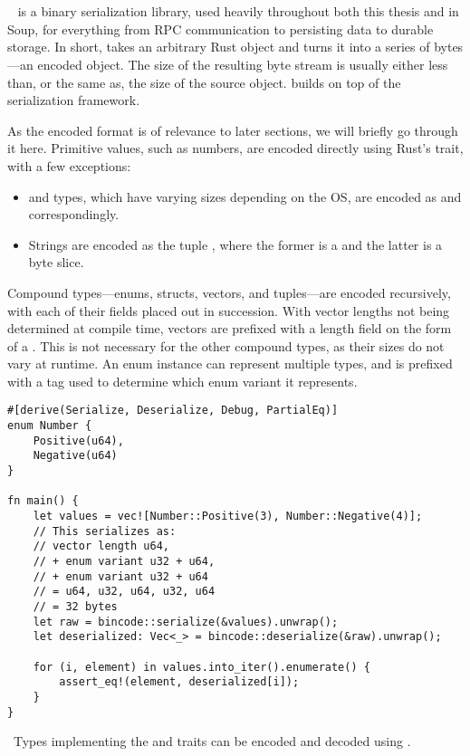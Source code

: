 \section{}\label{sec:bincode}

~\cite{bincode} is a binary serialization library, used heavily
throughout both this thesis and in Soup, for everything from RPC
communication to persisting data to durable storage. In short,  takes an
arbitrary Rust object and turns it into a series of bytes---an encoded object.
The size of the resulting byte stream is usually either less than, or the same
as, the size of the source object.  builds on top of the
 serialization framework.

As the encoded format is of relevance to later sections, we will briefly go
through it here. Primitive values, such as numbers, are encoded directly using
Rust's  trait, with a few exceptions:

\begin{itemize}
  \item {} and  types, which have varying sizes depending
    on the OS, are encoded as  and  correspondingly.
  \item Strings are encoded as the tuple , where
    the former is a  and the latter is a byte slice.
\end{itemize}

Compound types---enums, structs, vectors, and tuples---are encoded recursively,
with each of their fields placed out in succession. With vector lengths not
being determined at compile time, vectors are prefixed with a length field on
the form of a . This is not necessary for the other compound types, as
their sizes do not vary at runtime. An enum instance can represent multiple
types, and is prefixed with a  tag used to determine which
enum variant it represents.

\begin{listing}[H]
  \begin{verbatim}
#[derive(Serialize, Deserialize, Debug, PartialEq)]
enum Number {
    Positive(u64),
    Negative(u64)
}

fn main() {
    let values = vec![Number::Positive(3), Number::Negative(4)];
    // This serializes as:
    // vector length u64,
    // + enum variant u32 + u64,
    // + enum variant u32 + u64
    // = u64, u32, u64, u32, u64
    // = 32 bytes
    let raw = bincode::serialize(&values).unwrap();
    let deserialized: Vec<_> = bincode::deserialize(&raw).unwrap();

    for (i, element) in values.into_iter().enumerate() {
        assert_eq!(element, deserialized[i]);
    }
}
  \end{verbatim}

  \caption{\
    Types implementing the  and  traits can be
    encoded and decoded using \code{bincode}.
  }\label{lst:bincode}
\end{listing}


